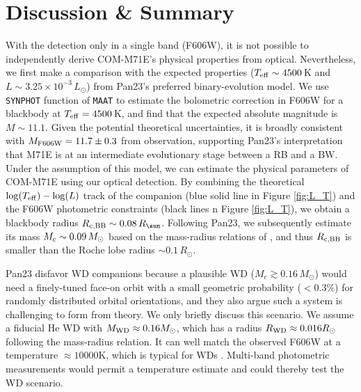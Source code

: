 \documentclass[twocolumn]{aastex631}
\begin{document}
\section{Discussion \& Summary} \label{sec:discussion}

With the detection only in a single band (F606W), it is not possible to independently derive COM-M71E's physical properties from optical. Nevertheless, we first make a comparison with the expected properties ($T_{\rm eff}\sim4500$\,K and $L\sim3.25\times10^{-3}\,L_\odot$) from Pan23's preferred binary-evolution model. We use \texttt{SYNPHOT} function of \texttt{MAAT} \citep{Ofek2014} to estimate the bolometric correction in F606W for a blackbody at $T_{\rm eff} = 4500$\,K, and find that the expected absolute magnitude is $M \sim 11.1$. Given the potential theoretical uncertainties, it is broadly consistent with $M_{\rm F606W} = 11.7\pm0.3$ from observation, supporting Pan23's interpretation that M71E is at an intermediate evolutionary stage between a RB and a BW. Under the assumption of this model, we can estimate the physical parameters of COM-M71E using our optical detection. By combining the theoretical $\log(T_{\rm eff})-\log(L)$ track of the companion (blue solid line in Figure \ref{fig:L_T}) and the F606W photometric constraints (black lines n Figure \ref{fig:L_T}), we obtain a blackbody radius $R_{\rm c, BB} \sim 0.08\,R_\sun$. Following Pan23, we subsequently estimate its mass $M_{\rm c} \sim 0.09\,M_\odot$ based on the mass-radius relations of \citet{Burrows1993}, and thus $R_{\rm c, BB}$ is smaller than the Roche lobe radius $\sim 0.1\,R_\odot$.

Pan23 disfavor WD companions because a plausible WD ($M_c\gtrsim0.16\,M_\odot$) would need a finely-tuned face-on orbit with a small geometric probability ($<0.3\%$) for randomly distributed orbital orientations, and they also argue such a system is challenging to form from theory. We  only briefly discuss this scenario. We assume a fiducial He WD
with $M_{\rm WD} \approx 0.16 M_\odot$, which has a radius $R_{\rm WD} \approx 0.016 R_\odot$ following the mass-radius relation. It can well match the observed F606W at a temperature $\approx10000$K, which is typical for WDs \citep[see, e.g.,][]{Brown2016}. Multi-band photometric measurements would permit a temperature estimate and could thereby test the WD scenario.
\end{document}
